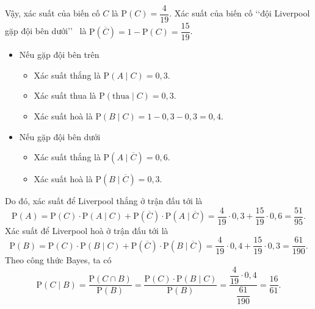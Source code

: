 \begin{ex}
{\begin{itemchoice}
			Vậy, xác suất của biến cố $C$ là $\mathrm{P}(C) = \dfrac{4}{19}$.
			\itemch Xác suất của biến cố \lq\lq đội Liverpool gặp đội bên dưới\rq\rq~ là $\mathrm{P}\left(\overline{C}\right) = 1 - \mathrm{P}(C) = \dfrac{15}{19}$.
			\begin{itemize}
				\item Nếu gặp đội bên trên
				\begin{itemize}
					\item Xác suất thắng là $\mathrm{P}(A\mid C) = 0{,}3$.
					\item Xác suất thua là $\mathrm{P}(\text{thua}\mid C) = 0{,}3$.
					\item Xác suất hoà là $\mathrm{P}(B\mid C) = 1 - 0{,}3 - 0{,}3 = 0{,}4$.
				\end{itemize}
				\item Nếu gặp đội bên dưới
				\begin{itemize}
					\item Xác suất thắng là $\mathrm{P}\left(A\mid \overline{C}\right) = 0{,}6$.
					\item Xác suất hoà là $\mathrm{P}\left(B\mid \overline{C}\right) = 0{,}3$.
				\end{itemize}
			\end{itemize}
			Do đó, xác suất để Liverpool thắng ở trận đấu tới là
			\[\mathrm{P}(A) = \mathrm{P}(C) \cdot \mathrm{P}(A\mid C) + \mathrm{P}\left(\overline{C}\right) \cdot \mathrm{P}\left(A\mid \overline{C}\right) = \dfrac{4}{19} \cdot 0{,}3 + \dfrac{15}{19} \cdot 0{,}6 = \dfrac{51}{95}.\]
			\itemch Xác suất để Liverpool hoà ở trận đấu tới là
			\[\mathrm{P}(B) = \mathrm{P}(C) \cdot \mathrm{P}(B\mid C) + \mathrm{P}\left(\overline{C}\right) \cdot \mathrm{P}\left(B\mid \overline{C}\right) = \dfrac{4}{19} \cdot 0{,}4 + \dfrac{15}{19} \cdot 0{,}3 = \dfrac{61}{190}.\]
			\itemch Theo công thức Bayes, ta có
			\[\mathrm{P}(C\mid B) = \dfrac{\mathrm{P}(C \cap B)}{\mathrm{P}(B)} = \dfrac{\mathrm{P}(C) \cdot \mathrm{P}(B\mid C)}{\mathrm{P}(B)} = \dfrac{\dfrac{4}{19} \cdot 0{,}4}{\dfrac{61}{190}} = \dfrac{16}{61}.\]
		\end{itemchoice}
	}
\end{ex}

